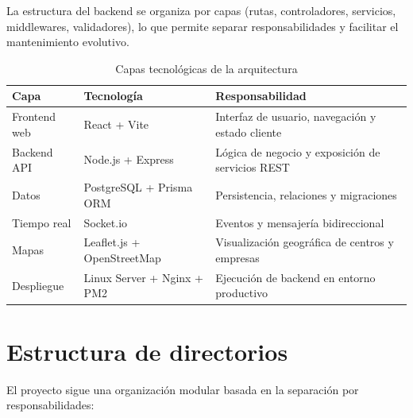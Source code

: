 \documentclass[12pt, a4paper]{report}
\begin{document}
La estructura del backend se organiza por capas (rutas, controladores, servicios, middlewares,
validadores), lo que permite separar responsabilidades y facilitar el mantenimiento evolutivo.

\vspace{0.5em}
\begin{table}[H]
  \centering
  \caption{Capas tecnológicas de la arquitectura}
  \begin{tabularx}{\textwidth}{llX}
    \toprule
    \textbf{Capa} & \textbf{Tecnología} & \textbf{Responsabilidad} \\
    \midrule
    Frontend web    & React + Vite             & Interfaz de usuario, navegación y estado cliente \\
    Backend API     & Node.js + Express        & Lógica de negocio y exposición de servicios REST \\
    Datos           & PostgreSQL + Prisma ORM  & Persistencia, relaciones y migraciones \\
    Tiempo real     & Socket.io                & Eventos y mensajería bidireccional \\
    Mapas           & Leaflet.js + OpenStreetMap & Visualización geográfica de centros y empresas \\
    Despliegue      & Linux Server + Nginx + PM2 & Ejecución de backend en entorno productivo \\
    \bottomrule
  \end{tabularx}
\end{table}

\section{Estructura de directorios}

El proyecto sigue una organización modular basada en la separación por responsabilidades:
\end{document}
